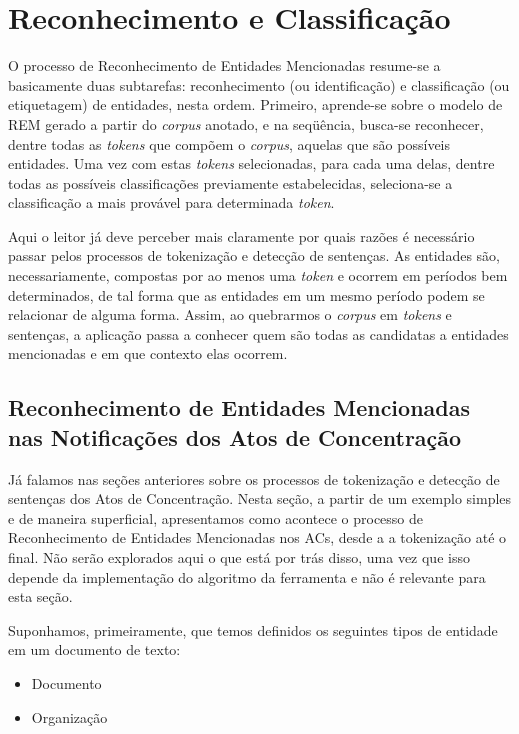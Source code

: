 \documentclass[11pt]{report}
\begin{document}
\section{Reconhecimento e Classificação}

\indent\indent O processo de Reconhecimento de Entidades Mencionadas resume-se a basicamente duas subtarefas: reconhecimento (ou identificação) e classificação (ou etiquetagem)
de entidades, nesta ordem. Primeiro, aprende-se sobre o modelo de REM gerado a partir do \textit{corpus} anotado, e na seqüência, busca-se reconhecer, dentre todas as \textit{tokens}
que compõem o \textit{corpus}, aquelas que são possíveis entidades. Uma vez com estas \textit{tokens} selecionadas, para cada uma delas, dentre todas as possíveis classificações
previamente estabelecidas, seleciona-se a classificação a mais provável para determinada \textit{token}.

Aqui o leitor já deve perceber mais claramente por quais razões é necessário passar pelos processos de tokenização e detecção de sentenças. As entidades são, necessariamente,
compostas por ao menos uma \textit{token} e ocorrem em períodos bem determinados, de tal forma que as entidades em um mesmo período podem se relacionar de alguma forma. Assim,
ao quebrarmos o \textit{corpus} em \textit{tokens} e sentenças, a aplicação passa a conhecer quem são todas as candidatas a entidades mencionadas e em que contexto elas ocorrem.

\subsection{Reconhecimento de Entidades Mencionadas nas Notificações dos Atos de Concentração}

\indent\indent Já falamos nas seções anteriores sobre os processos de tokenização e detecção de sentenças dos Atos de Concentração. Nesta seção, a partir de um exemplo simples e
de maneira superficial, apresentamos como acontece o processo de Reconhecimento de Entidades Mencionadas nos ACs, desde a a tokenização até o final. Não serão explorados aqui
o que está por trás disso, uma vez que isso depende da implementação do algoritmo da ferramenta e não é relevante para esta seção.

Suponhamos, primeiramente, que temos definidos os seguintes tipos de entidade em um documento de texto:

\begin{itemize}
  \item Documento
  \item Organização
\end{itemize}
\end{document}

